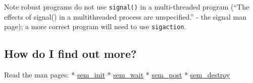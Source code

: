 \begin{Shaded}
\begin{Highlighting}[]


  
\NormalTok{\{}
\NormalTok{\}}

  
\NormalTok{\{}
    \NormalTok{);}
\NormalTok{\}}

 
\NormalTok{\{}
     \NormalTok{, } \NormalTok{); }
     \NormalTok{) \{}
       \NormalTok{);}
        \NormalTok{;}
    \NormalTok{\}}

\NormalTok{\}}
\end{Highlighting}
\end{Shaded}

Note robust programs do not use \texttt{signal()} in a multi-threaded
program (``The effects of signal() in a multithreaded process are
unspecified.'' - the signal man page); a more correct program will need
to use \texttt{sigaction}.

\subsection{How do I find out more?}\label{how-do-i-find-out-more-1}

Read the man pages: *
\href{http://man7.org/linux/man-pages/man3/sem_init.3.html}{sem\_init} *
\href{http://man7.org/linux/man-pages/man3/sem_wait.3.html}{sem\_wait} *
\href{http://man7.org/linux/man-pages/man3/sem_post.3.html}{sem\_post} *
\href{http://man7.org/linux/man-pages/man3/sem_destroy.3.html}{sem\_destroy}


